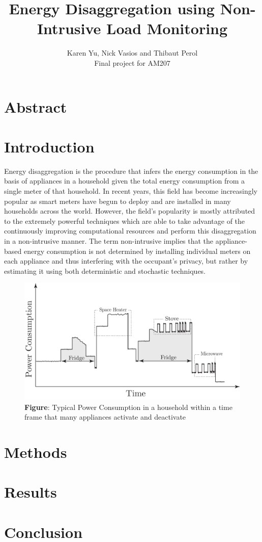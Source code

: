 \documentclass[11pt]{article}
\title{Energy Disaggregation using Non-Intrusive Load Monitoring}
\author{Karen Yu, Nick Vasios and Thibaut Perol\\ \small Final project for AM207}
\date{}
\begin{document}
\maketitle


\section{Abstract}

\section{Introduction}

Energy disaggregation is the procedure that infers the energy consumption in the basis of appliances in a household given the total energy consumption from a single meter of that household. In recent years, this field has become increasingly popular as smart meters have begun to deploy and are installed in many households across the world. However, the field's popularity is mostly attributed to the extremely powerful techniques which are able to take advantage of the continuously improving computational resources and perform this disaggregation in a non-intrusive manner. The term non-intrusive implies that the appliance-based energy consumption is not determined by installing individual meters on each appliance and thus interfering with the occupant's privacy, but rather by estimating it using both deterministic and stochastic techniques.
\begin{figure}
\begin{center}
\includegraphics[width= 20 pc]{./../poster/Figures/Qualitative}
\caption*{\footnotesize  \textbf{Figure}: Typical Power Consumption in a household within a time frame that many appliances activate and deactivate} \vspace*{-1 cm}
\end{center}
\end{figure}

\section{Methods}

\section{Results}

\section{Conclusion}





\end{document}
